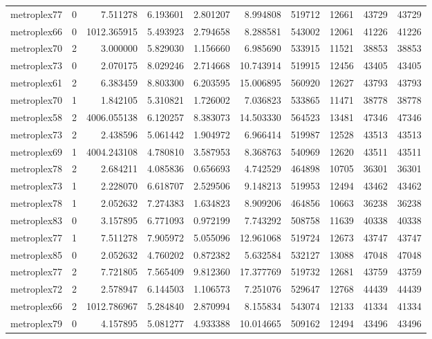 \begin{longtable}{|l|r|r|r|r|r|r|r|r|r|}
metroplex77 & 0 & 7.511278 & 6.193601 & 2.801207 & 8.994808 & 519712 & 12661 & 43729 & 43729 \\
metroplex66 & 0 & 1012.365915 & 5.493923 & 2.794658 & 8.288581 & 543002 & 12061 & 41226 & 41226 \\
metroplex70 & 2 & 3.000000 & 5.829030 & 1.156660 & 6.985690 & 533915 & 11521 & 38853 & 38853 \\
metroplex73 & 0 & 2.070175 & 8.029246 & 2.714668 & 10.743914 & 519915 & 12456 & 43405 & 43405 \\
metroplex61 & 2 & 6.383459 & 8.803300 & 6.203595 & 15.006895 & 560920 & 12627 & 43793 & 43793 \\
metroplex70 & 1 & 1.842105 & 5.310821 & 1.726002 & 7.036823 & 533865 & 11471 & 38778 & 38778 \\
metroplex58 & 2 & 4006.055138 & 6.120257 & 8.383073 & 14.503330 & 564523 & 13481 & 47346 & 47346 \\
metroplex73 & 2 & 2.438596 & 5.061442 & 1.904972 & 6.966414 & 519987 & 12528 & 43513 & 43513 \\
metroplex69 & 1 & 4004.243108 & 4.780810 & 3.587953 & 8.368763 & 540969 & 12620 & 43511 & 43511 \\
metroplex78 & 2 & 2.684211 & 4.085836 & 0.656693 & 4.742529 & 464898 & 10705 & 36301 & 36301 \\
metroplex73 & 1 & 2.228070 & 6.618707 & 2.529506 & 9.148213 & 519953 & 12494 & 43462 & 43462 \\
metroplex78 & 1 & 2.052632 & 7.274383 & 1.634823 & 8.909206 & 464856 & 10663 & 36238 & 36238 \\
metroplex83 & 0 & 3.157895 & 6.771093 & 0.972199 & 7.743292 & 508758 & 11639 & 40338 & 40338 \\
metroplex77 & 1 & 7.511278 & 7.905972 & 5.055096 & 12.961068 & 519724 & 12673 & 43747 & 43747 \\
metroplex85 & 0 & 2.052632 & 4.760202 & 0.872382 & 5.632584 & 532127 & 13088 & 47048 & 47048 \\
metroplex77 & 2 & 7.721805 & 7.565409 & 9.812360 & 17.377769 & 519732 & 12681 & 43759 & 43759 \\
metroplex72 & 2 & 2.578947 & 6.144503 & 1.106573 & 7.251076 & 529647 & 12768 & 44439 & 44439 \\
metroplex66 & 2 & 1012.786967 & 5.284840 & 2.870994 & 8.155834 & 543074 & 12133 & 41334 & 41334 \\
metroplex79 & 0 & 4.157895 & 5.081277 & 4.933388 & 10.014665 & 509162 & 12494 & 43496 & 43496 \\

\end{longtable}
